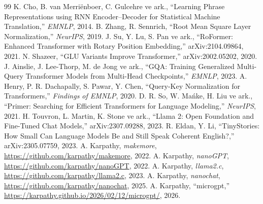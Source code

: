 \begin{thebibliography}{99}
 K. Cho, B. van Merriënboer, C. Gulcehre ve ark., ``Learning Phrase Representations using RNN Encoder--Decoder for Statistical Machine Translation,'' \emph{EMNLP}, 2014.
 B. Zhang, R. Sennrich, ``Root Mean Square Layer Normalization,'' \emph{NeurIPS}, 2019.
 J. Su, Y. Lu, S. Pan ve ark., ``RoFormer: Enhanced Transformer with Rotary Position Embedding,'' arXiv:2104.09864, 2021.
 N. Shazeer, ``GLU Variants Improve Transformer,'' arXiv:2002.05202, 2020.
 J. Ainslie, J. Lee-Thorp, M. de Jong ve ark., ``GQA: Training Generalized Multi-Query Transformer Models from Multi-Head Checkpoints,'' \emph{EMNLP}, 2023.
 A. Henry, P. R. Dachapally, S. Pawar, Y. Chen, ``Query-Key Normalization for Transformers,'' \emph{Findings of EMNLP}, 2020.
 D. R. So, W. Mańke, H. Liu ve ark., ``Primer: Searching for Efficient Transformers for Language Modeling,'' \emph{NeurIPS}, 2021.
 H. Touvron, L. Martin, K. Stone ve ark., ``Llama 2: Open Foundation and Fine-Tuned Chat Models,'' arXiv:2307.09288, 2023.
 R. Eldan, Y. Li, ``TinyStories: How Small Can Language Models Be and Still Speak Coherent English?,'' arXiv:2305.07759, 2023.
 A. Karpathy, \emph{makemore}, \url{https://github.com/karpathy/makemore}, 2022.
 A. Karpathy, \emph{nanoGPT}, \url{https://github.com/karpathy/nanoGPT}, 2022.
 A. Karpathy, \emph{llama2.c}, \url{https://github.com/karpathy/llama2.c}, 2023.
 A. Karpathy, \emph{nanochat}, \url{https://github.com/karpathy/nanochat}, 2025.
 A. Karpathy, ``microgpt,'' \url{https://karpathy.github.io/2026/02/12/microgpt/}, 2026.
\end{thebibliography}
